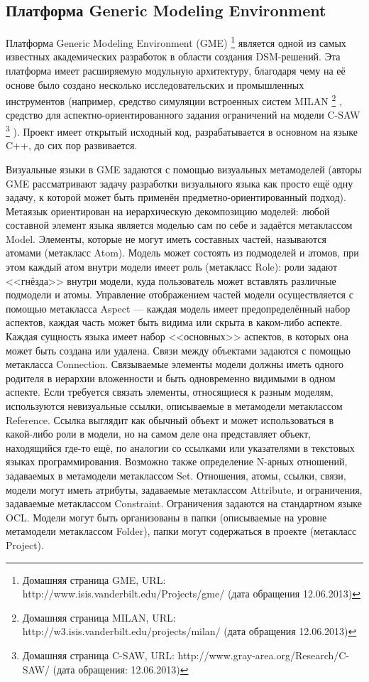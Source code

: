 \subsection{Платформа Generic Modeling Environment}
Платформа Generic Modeling Environment (GME)%
\footnote{Домашняя страница GME, URL: http://www.isis.vanderbilt.edu/Projects/gme/ (дата обращения 12.06.2013)}
\cite{ledeczi2001generic} является одной из самых известных академических разработок в области создания \ac{DSM}-решений. 
Эта платформа имеет расширяемую модульную архитектуру, благодаря чему на её основе было создано 
несколько исследовательских и промышленных инструментов (например, средство симуляции встроенных систем MILAN%
\footnote{Домашняя страница MILAN, URL: http://w3.isis.vanderbilt.edu/projects/milan/ (дата обращения 12.06.2013)}%
, средство для аспектно-ориентированного задания ограничений на модели C-SAW%
\footnote{Домашняя страница C-SAW, URL: http://www.gray-area.org/Research/C-SAW/ (дата обращения: 12.06.2013)}%
). Проект имеет открытый исходный код, разрабатывается в основном на языке C++, до сих пор развивается.

Визуальные языки в GME задаются с помощью визуальных метамоделей (авторы GME рассматривают 
задачу разработки визуального языка как просто ещё одну задачу, к которой может быть 
применён предметно-ориентированный подход). Метаязык ориентирован на иерархическую 
декомпозицию моделей: любой составной элемент языка является моделью сам по себе и 
задаётся метаклассом Model. Элементы, которые не могут иметь составных частей, называются 
атомами (метакласс Atom). Модель может состоять из подмоделей и атомов, при этом каждый 
атом внутри модели имеет роль (метакласс Role): роли задают <<гнёзда>> внутри модели, 
куда пользователь может вставлять различные подмодели и атомы. Управление отображением 
частей модели осуществляется с помощью метакласса Aspect --- каждая модель имеет предопределённый 
набор аспектов, каждая часть может быть видима или скрыта в каком-либо аспекте. Каждая 
сущность языка имеет набор <<основных>> аспектов, в которых она может быть создана 
или удалена. Связи между объектами задаются с помощью метакласса Connection. Связываемые 
элементы модели должны иметь одного родителя в иерархии вложенности и быть одновременно 
видимыми в одном аспекте. Если требуется связать элементы, относящиеся к разным моделям, 
используются невизуальные ссылки, описываемые в метамодели метаклассом Reference. Ссылка 
выглядит как обычный объект и может использоваться в какой-либо роли в модели, но на 
самом деле она представляет объект, находящийся где-то ещё, по аналогии со ссылками 
или указателями в текстовых языках программирования. Возможно также определение N-арных 
отношений, задаваемых в метамодели метаклассом Set. Отношения, атомы, ссылки, связи, 
модели могут иметь атрибуты, задаваемые метаклассом Attribute, и ограничения, задаваемые 
метаклассом Constraint. Ограничения задаются на стандартном языке OCL. Модели могут 
быть организованы в папки (описываемые на уровне метамодели метаклассом Folder), папки 
могут содержаться в проекте (метакласс Project).


